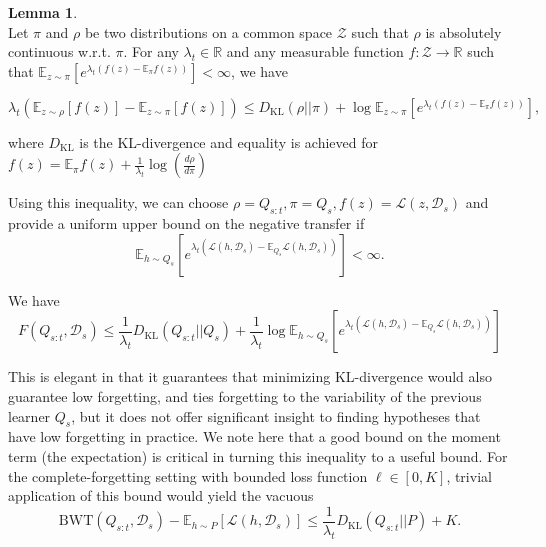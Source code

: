 \documentclass[letterpaper]{article}
\theoremstyle{definition}
\newtheorem{lemma}{Lemma}[section]
\begin{document}
\begin{lemma} \label{lemma:concentration} \cite{shui2020beyond} \\
	Let $\pi$ and $\rho$ be two distributions on a common space $\mathcal{Z}$ such that $\rho$ is absolutely continuous w.\!r.\!t.\! $\pi$. For any $\lambda_t\in \mathbb{R}$ and any measurable function $f:\mathcal{Z}\rightarrow \mathbb{R}$ such that $\mathbb{E}_{z\sim \pi}\left [e^{\lambda_t(f(z)-\mathbb{E}_\pi f(z))} \right ]<\infty$, we have
	
	\begin{equation}
	\lambda_t\left (\mathbb{E}_{z\sim \rho}\left [f(z) \right ]-\mathbb{E}_{z\sim \pi}\left [f(z) \right ]\right )\leq D_{\mathrm{KL}}(\rho||\pi)+ \log\mathbb{E}_{z\sim \pi}\left [e^{\lambda_t(f(z)-\mathbb{E}_\pi f(z))} \right ],
	\end{equation}
	
	where $D_{\mathrm{KL}}$ is the KL-divergence and equality is achieved for $f(z)=\mathbb{E}_\pi f(z)+\frac{1}{\lambda_t}\log(\frac{d\rho}{d\pi})$
\end{lemma}

Using this inequality, we can choose $\rho=Q_{s:t}, \pi=Q_s, f(z)=\mathcal{L}(z,\mathcal{D}_s)$ and provide a uniform upper bound on the negative transfer if $$\mathbb{E}_{h\sim Q_s}\left [e^{\lambda_t(\mathcal{L}(h,\mathcal{D}_s)-\mathbb{E}_{Q_s} \mathcal{L}(h,\mathcal{D}_s))} \right ]<\infty.$$

We have 
\begin{equation*}
F(Q_{s:t},\mathcal{D}_s)\leq \frac{1}{\lambda_t}D_{\mathrm{KL}}(Q_{s:t}||Q_s)+\frac{1}{\lambda_t}\log\mathbb{E}_{h\sim Q_s}\left [e^{\lambda_t(\mathcal{L}(h,\mathcal{D}_s)-\mathbb{E}_{Q_s} \mathcal{L}(h,\mathcal{D}_s))} \right ]
\end{equation*}

This is elegant in that it guarantees that minimizing KL-divergence would also guarantee low forgetting, and ties forgetting to the variability of the previous learner $Q_s$, but it does not offer significant insight to finding hypotheses that have low forgetting in practice. We note here that a good bound on the moment term (the expectation) is critical in turning this inequality to a useful bound. For the complete-forgetting setting with bounded loss function $\ell\in [0,K]$, trivial application of this bound would yield the vacuous $$\mathrm{BWT}(Q_{s:t},\mathcal{D}_s)-\mathbb{E}_{h\sim P}\left [\mathcal{L}(h,\mathcal{D}_s)\right ]\leq  \frac{1}{\lambda_t}D_{\mathrm{KL}}(Q_{s:t}||P)+K.$$
\end{document}
